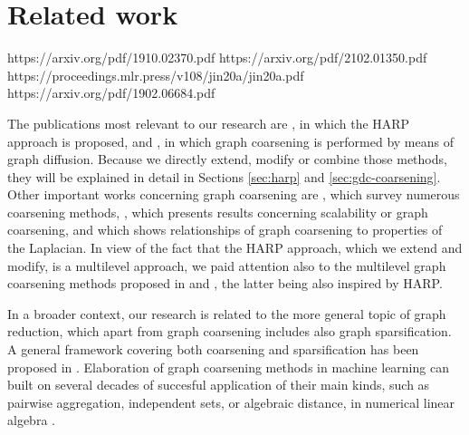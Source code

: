 \section{Related work}

https://arxiv.org/pdf/1910.02370.pdf
https://arxiv.org/pdf/2102.01350.pdf
https://proceedings.mlr.press/v108/jin20a/jin20a.pdf
https://arxiv.org/pdf/1902.06684.pdf

The publications most relevant to our research are \cite{chen_harp_2018}, in which the HARP approach is proposed, and \cite{gasteiger_diffusion_2019}, in which graph coarsening is performed by means of graph diffusion. Because we directly extend, modify or combine those methods, they will be explained in detail in Sections \ref{sec:harp} and \ref{sec:gdc-coarsening}. Other important works concerning graph coarsening are \cite{akyildiz_understanding_2020, chen_graph_2022}, which survey numerous coarsening methods, \cite{huang_scaling_2021}, which presents results concerning scalability or graph coarsening, and \cite{loukas_graph_2019} which shows relationships of graph coarsening to properties of the Laplacian. In view of the fact that the HARP approach, which we extend and modify, is a multilevel approach, we paid attention also to the multilevel graph coarsening methods proposed in \cite{xie_graph_2020} and \cite{zhang_harp_2021}, the latter being also inspired by HARP.

In a broader context, our research is related to the more general topic of graph reduction, which apart from graph coarsening includes also graph sparsification. A general framework covering both coarsening and sparsification has been proposed in \cite{bravo_hermsdorff_unifying_2019}. Elaboration of graph coarsening methods in machine learning can built on several decades of succesful application of their main kinds, such as pairwise aggregation, independent sets, or algebraic distance, in numerical linear algebra \cite{chen_graph_2022}.
